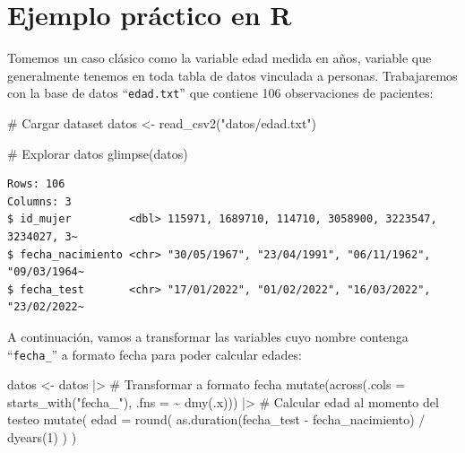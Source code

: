 \documentclass[
  spanish,
  a4paper,
]{scrbook}
\newenvironment{Shaded}{\begin{snugshade}}{\end{snugshade}}
\newcommand{\AttributeTok}[1]{\textcolor[rgb]{0.40,0.45,0.13}{#1}}
\newcommand{\CommentTok}[1]{\textcolor[rgb]{0.37,0.37,0.37}{#1}}
\newcommand{\DecValTok}[1]{\textcolor[rgb]{0.68,0.00,0.00}{#1}}
\newcommand{\FunctionTok}[1]{\textcolor[rgb]{0.28,0.35,0.67}{#1}}
\newcommand{\NormalTok}[1]{\textcolor[rgb]{0.00,0.23,0.31}{#1}}
\newcommand{\OtherTok}[1]{\textcolor[rgb]{0.00,0.23,0.31}{#1}}
\newcommand{\SpecialCharTok}[1]{\textcolor[rgb]{0.37,0.37,0.37}{#1}}
\newcommand{\StringTok}[1]{\textcolor[rgb]{0.13,0.47,0.30}{#1}}
\begin{document}
\section{Ejemplo práctico en R}\label{ejemplo-pruxe1ctico-en-r-2}

Tomemos un caso clásico como la variable edad medida en años, variable
que generalmente tenemos en toda tabla de datos vinculada a personas.
Trabajaremos con la base de datos ``\texttt{edad.txt}'' que contiene 106
observaciones de pacientes:

\begin{Shaded}
\begin{Highlighting}[]
\CommentTok{\# Cargar dataset}
\NormalTok{datos }\OtherTok{\textless{}{-}} \FunctionTok{read\_csv2}\NormalTok{(}\StringTok{"datos/edad.txt"}\NormalTok{)}

\CommentTok{\# Explorar datos}
\FunctionTok{glimpse}\NormalTok{(datos)}
\end{Highlighting}
\end{Shaded}

\begin{verbatim}
Rows: 106
Columns: 3
$ id_mujer         <dbl> 115971, 1689710, 114710, 3058900, 3223547, 3234027, 3~
$ fecha_nacimiento <chr> "30/05/1967", "23/04/1991", "06/11/1962", "09/03/1964~
$ fecha_test       <chr> "17/01/2022", "01/02/2022", "16/03/2022", "23/02/2022~
\end{verbatim}

A continuación, vamos a transformar las variables cuyo nombre contenga
``\texttt{fecha\_}'' a formato fecha para poder calcular edades:

\begin{Shaded}
\begin{Highlighting}[]
\NormalTok{datos }\OtherTok{\textless{}{-}}\NormalTok{ datos }\SpecialCharTok{|\textgreater{}}
  \CommentTok{\# Transformar a formato fecha}
  \FunctionTok{mutate}\NormalTok{(}\FunctionTok{across}\NormalTok{(}\AttributeTok{.cols =} \FunctionTok{starts\_with}\NormalTok{(}\StringTok{"fecha\_"}\NormalTok{), }\AttributeTok{.fns =} \SpecialCharTok{\textasciitilde{}} \FunctionTok{dmy}\NormalTok{(.x))) }\SpecialCharTok{|\textgreater{}}
  \CommentTok{\# Calcular edad al momento del testeo}
  \FunctionTok{mutate}\NormalTok{(}
    \AttributeTok{edad =} \FunctionTok{round}\NormalTok{(}
      \FunctionTok{as.duration}\NormalTok{(fecha\_test }\SpecialCharTok{{-}}\NormalTok{ fecha\_nacimiento) }\SpecialCharTok{/} \FunctionTok{dyears}\NormalTok{(}\DecValTok{1}\NormalTok{)}
\NormalTok{    )}
\NormalTok{  )}
\end{Highlighting}
\end{Shaded}
\end{document}
